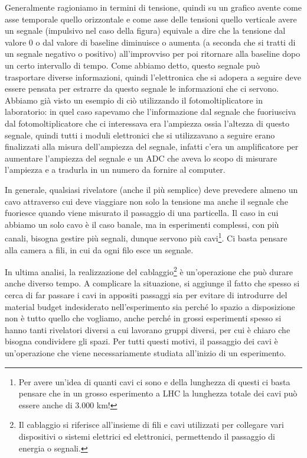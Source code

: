 Generalmente ragioniamo in termini di tensione, quindi su un grafico avente come asse temporale quello orizzontale e come asse delle tensioni quello verticale avere un segnale (impulsivo nel caso della figura) equivale a dire che la tensione dal valore 0 o dal valore di baseline diminuisce o aumenta (a seconda che si tratti di un segnale negativo o positivo) all'improvviso per poi ritornare alla baseline dopo un certo intervallo di tempo. Come abbiamo detto, questo segnale può trasportare diverse informazioni, quindi l'elettronica che si adopera a seguire deve essere pensata per estrarre da questo segnale le informazioni che ci servono. Abbiamo già visto un esempio di ciò utilizzando il fotomoltiplicatore in laboratorio: in quel caso sapevamo che l'informazione dal segnale che fuoriusciva dal fotomoltiplicatore che ci interessava era l'ampiezza ossia l'altezza di questo segnale, quindi tutti i moduli elettronici che si utilizzavano a seguire erano finalizzati alla misura dell'ampiezza del segnale, infatti c'era un amplificatore per aumentare l'ampiezza del segnale e un ADC che aveva lo scopo di misurare l'ampiezza e a tradurla in un numero da fornire al computer.

In generale, qualsiasi rivelatore (anche il più semplice) deve prevedere almeno un cavo attraverso cui deve viaggiare non solo la tensione ma anche il segnale che fuoriesce quando viene misurato il passaggio di una particella. Il caso in cui abbiamo un solo cavo è il caso banale, ma in esperimenti complessi, con più canali, bisogna gestire più segnali, dunque servono più cavi\footnote{Per avere un'idea di quanti cavi ci sono e della lunghezza di questi ci basta pensare che in un grosso esperimento a LHC la lunghezza totale dei cavi può essere anche di 3.000 km!}. Ci basta pensare alla camera a fili, in cui da ogni filo esce un segnale.

In ultima analisi, la realizzazione del cablaggio\footnote{Il cablaggio si riferisce all'insieme di fili e cavi utilizzati per collegare vari dispositivi o sistemi elettrici ed elettronici, permettendo il passaggio di energia o segnali.} è un'operazione che può durare anche diverso tempo. A complicare la situazione, si aggiunge il fatto che spesso si cerca di far passare i cavi in appositi passaggi sia per evitare di introdurre del material budget indesiderato nell'esperimento sia perché lo spazio a disposizione non è tutto quello che vogliamo, anche perché in grossi esperimenti spesso si hanno tanti rivelatori diversi a cui lavorano gruppi diversi, per cui è chiaro che bisogna condividere gli spazi. Per tutti questi motivi, il passaggio dei cavi è un'operazione che viene necessariamente studiata all'inizio di un esperimento.

